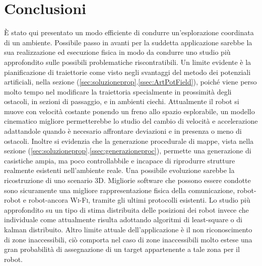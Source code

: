 \section{Conclusioni}
\label{sec:conclusioni}
È stato qui presentato un modo efficiente di condurre un'esplorazione coordinata
di un ambiente.
Possibile passo in avanti per la suddetta applicazione sarebbe la sua
realizzazione ed esecuzione fisica in modo da condurre uno studio più
approfondito sulle possibili problematiche riscontratibili.
Un limite evidente è la pianificazione di traiettorie come visto negli svantaggi
del metodo dei potenziali artificiali, nella sezione
(\ref{sec:soluzioneprop}.\ref{ssec:ArtPotField}), poiché viene perso molto tempo
nel modificare la traiettoria specialmente in prossimità degli ostacoli,
in sezioni di passaggio, e in ambienti ciechi.
Attualmente il robot si muove con velocità costante ponendo un freno allo spazio
esplorabile, un modello cinematico migliore permetterebbe lo studio del cambio
di velocità e accelerazione adattandole quando è necesario affrontare
deviazioni e in presenza o meno di ostacoli.
Inoltre si evidenzia che la generazione procedurale di mappe, vista nella
sezione (\ref{sec:soluzioneprop}.\ref{ssec:generazioneproc}), permette una
generazione di casistiche ampia, ma poco controllabbile e incapace di riprodurre
strutture realmente esistenti nell'ambiente reale.
Una possibile evoluzione sarebbe la ricostruzione di uno scenario 3D.
Migliorie software che possono essere condotte sono sicuramente una migliore
rappresentazione fisica della comunicazione, robot-robot e robot-ancora
\textsc{Wi-Fi}, tramite gli ultimi protocolli esistenti.
Lo studio più approfondito su un tipo di stima distribuita delle posizioni dei
robot invece che individuale come attualmente risulta adottando algoritmi di
least-square o di kalman distribuito.
Altro limite attuale dell'applicazione è il non riconoscimento di zone
inaccessibili, ciò comporta nel caso di zone inaccessibili molto estese una gran
probabilità di assegnazione di un target appartenente a tale zona per il robot.
